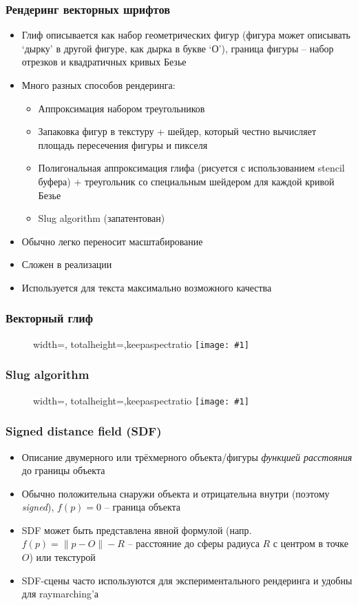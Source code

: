 \documentclass{beamer}
\newcommand{\slideimage}[1]{
  \begin{figure}
    \begin{adjustbox}{width=\textwidth, totalheight=\textheight-2\baselineskip-2\baselineskip,keepaspectratio}
      \texttt{[image: \#1]}
    \end{adjustbox}
  \end{figure}
}
\begin{document}
\begin{frame}[fragile]
\frametitle{Рендеринг векторных шрифтов}
\begin{itemize}
\item Глиф описывается как набор геометрических фигур (фигура может описывать `дырку' в другой фигуре, как дырка в букве `О'), граница фигуры -- набор отрезков и квадратичных кривых Безье
\pause
\item Много разных способов рендеринга:
\pause
\begin{itemize}
\item Аппроксимация набором треугольников
\pause
\item Запаковка фигур в текстуру + шейдер, который честно вычисляет площадь пересечения фигуры и пикселя
\pause
\item Полигональная аппроксимация глифа (рисуется с использованием stencil буфера) + треугольник со специальным шейдером для каждой кривой Безье
\pause
\item Slug algorithm (запатентован)
\end{itemize}
\pause
\item Обычно легко переносит масштабирование
\pause
\item Сложен в реализации
\pause
\item Используется для текста максимально возможного качества
\end{itemize}
\end{frame}

\begin{frame}[fragile]
\frametitle{Векторный глиф}
\slideimage{vector-glyph.png}
\end{frame}

\begin{frame}[fragile]
\frametitle{Slug algorithm}
\slideimage{slug.jpg}
\end{frame}

\begin{frame}[fragile]
\frametitle{Signed distance field (SDF)}
\begin{itemize}
\item Описание двумерного или трёхмерного объекта/фигуры \textit{функцией расстояния} до границы объекта
\pause
\item Обычно положительна снаружи объекта и отрицательна внутри (поэтому \textit{signed}), \begin{math}f(p) = 0\end{math} -- граница объекта
\pause
\item SDF может быть представлена явной формулой (напр. \begin{math}f(p) = \|p - O\| - R\end{math} -- расстояние до сферы радиуса \begin{math}R\end{math} с центром в точке \begin{math}O\end{math}) или текстурой
\pause
\item SDF-сцены часто используются для экспериментального рендеринга и удобны для raymarching'а
\end{itemize}
\end{frame}
\end{document}
